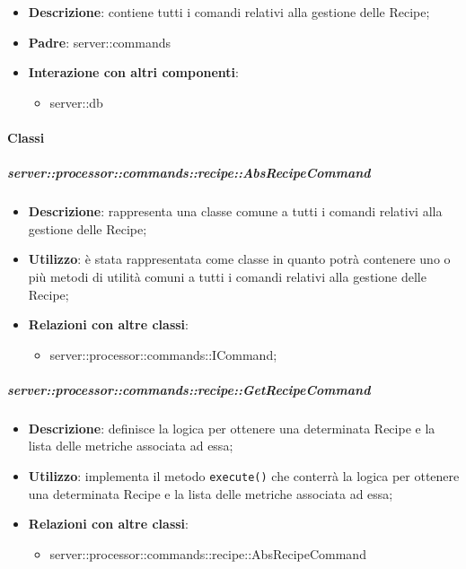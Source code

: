       \begin{itemize}
        \item \textbf{Descrizione}: contiene tutti i comandi relativi alla gestione delle Recipe;
        \item \textbf{Padre}: server::commands
        \item \textbf{Interazione con altri componenti}:
          \begin{itemize}
            \item server::db
          \end{itemize}
      \end{itemize}

        \paragraph{Classi} %

        \subparagraph{server::processor::commands::recipe::AbsRecipeCommand} %
        \label{subp:bdsm_app_server_processor_commands_recipe_absrecipecommand}
        \begin{itemize}
          \item \textbf{Descrizione}: rappresenta una classe comune a tutti i comandi relativi alla gestione delle Recipe;
          \item \textbf{Utilizzo}: è stata rappresentata come classe in quanto potrà contenere uno o più metodi di utilità comuni a tutti i comandi relativi alla gestione delle Recipe;
          \item \textbf{Relazioni con altre classi}:
            \begin{itemize}
              \item server::processor::commands::ICommand;
            \end{itemize}
        \end{itemize}

        \subparagraph{server::processor::commands::recipe::GetRecipeCommand} %
        \label{subp:bdsm_app_server_processor_commands_recipe_getrecipecommand}
        \begin{itemize}
          \item \textbf{Descrizione}: definisce la logica per ottenere una determinata Recipe e la lista delle metriche associata ad essa;
          \item \textbf{Utilizzo}: implementa il metodo \texttt{execute()} che conterrà la logica per ottenere una determinata Recipe e la lista delle metriche associata ad essa;
          \item \textbf{Relazioni con altre classi}:
            \begin{itemize}
              \item server::processor::commands::recipe::AbsRecipeCommand
            \end{itemize}
        \end{itemize}

